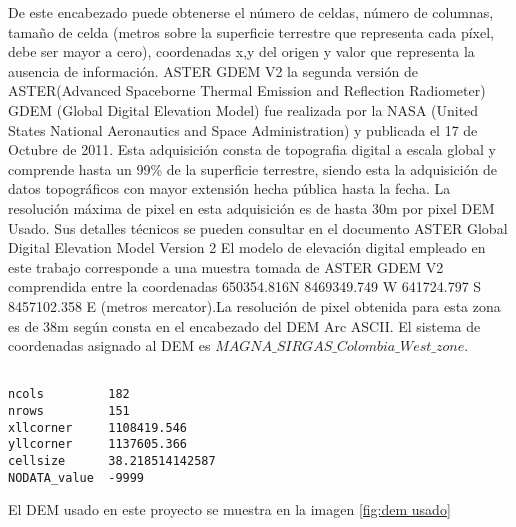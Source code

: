 De este encabezado puede obtenerse el n\'{u}mero de celdas, n\'{u}mero de columnas, tama\~{n}o de celda (metros
sobre la superficie terrestre que representa cada p\'{i}xel, debe ser mayor a cero),
coordenadas x,y del origen y valor que representa la ausencia de informaci\'{o}n.
ASTER GDEM V2
la segunda versi\'{o}n de ASTER(Advanced Spaceborne Thermal Emission and Reflection
Radiometer) GDEM (Global Digital Elevation Model) fue realizada por la NASA (United
States National Aeronautics and Space Administration) y publicada el 17 de Octubre de
2011. Esta adquisici\'{o}n consta de topografia digital a escala global y comprende hasta un
99\% de la superficie terrestre, siendo esta la adquisici\'{o}n de datos topogr\'{a}ficos con mayor
extensi\'{o}n hecha p\'{u}blica hasta la fecha.
La resoluci\'{o}n m\'{a}xima de pixel en esta adquisici\'{o}n es de hasta 30m por pixel
DEM Usado. Sus detalles t\'ecnicos se pueden consultar en el documento ASTER Global Digital Elevation Model Version 2 \cite{tachikawa2011aster}
El modelo de elevaci\'{o}n digital empleado en este trabajo corresponde a una muestra tomada
de ASTER GDEM V2 comprendida entre la coordenadas 650354.816N 8469349.749 W
641724.797 S 8457102.358 E (metros mercator).La resoluci\'{o}n de pixel obtenida para esta
zona es de 38m seg\'{u}n consta en el encabezado del DEM Arc ASCII. El sistema de
coordenadas asignado al DEM es $ MAGNA\_SIRGAS\_Colombia\_West\_zone$.\par

\begin{lstlisting}

ncols         182
nrows         151
xllcorner     1108419.546
yllcorner     1137605.366
cellsize      38.218514142587
NODATA_value  -9999
\end{lstlisting}

El DEM usado en este proyecto se muestra en la imagen \ref{fig:dem usado}
